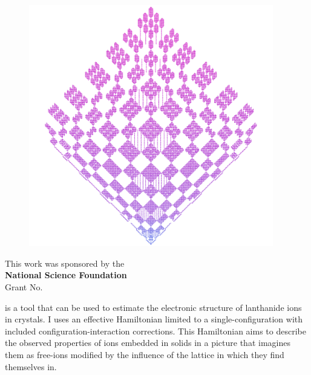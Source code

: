 \documentclass[11pt, twoside,openright]{article}
\begin{document}
\begin{center}
\vspace{-0.27cm}
\begin{figure}[h!]
	\begin{center}
		\includegraphics[width=0.95\textwidth]{nd_code.png}
	\end{center}
\end{figure}
\vspace{-0.7cm}
This work was sponsored by the \\ \textbf{National Science Foundation} \\ Grant No. 
\end{center}


\vspace*{\fill}

\cleardoublepage


\vspace*{\fill}

\qlanth is a tool that can be used to estimate the electronic structure of lanthanide ions in crystals. I uses an effective Hamiltonian limited to a single-configuration with included configuration-interaction corrections. This Hamiltonian aims to describe the observed properties of ions embedded in solids in a picture that imagines them as free-ions modified by the influence of the lattice in which they find themselves in.
\end{document}
